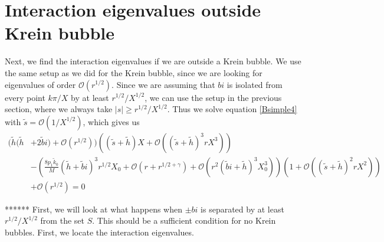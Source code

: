 \documentclass[thesis.tex]{subfiles}
\begin{document}
\section{Interaction eigenvalues outside Krein bubble}

Next, we find the interaction eigenvalues if we are outside a Krein bubble. We use the same setup as we did for the Krein bubble, since we are looking for eigenvalues of order $\mathcal{O}(r^{1/2})$. Since we are assuming that $bi$ is isolated from every point $k \pi / X$ by at least $r^{1/2}/X^{1/2}$, we can use the setup in the previous section, where we always take $|s| \geq r^{1/2}/X^{1/2}$. Thus we solve equation \cref{Bsimple4} with $\tilde{s} = \mathcal{O}(1/X^{1/2})$, which gives us
\begin{equation}\label{Binteig1}
\begin{aligned}
( \tilde{h}( \tilde{h} &+ 2 \tilde{b} i) + \mathcal{O}( r^{1/2} ))\left( (\tilde{s} + \tilde{h})X + \mathcal{O}\left( (\tilde{s} + \tilde{h})^3 r X^3 \right) \right) \\ 
&- \left(\frac{8 p_1 \tilde{k}_0}{M} ( \tilde{h} + \tilde{b}i)^3 r^{1/2} X_0 + \mathcal{O}(r + r^{1/2 + \gamma}) + \mathcal{O}(r^{2} (\tilde{b}i + \tilde{h})^3 X_0^3) \right)\left( 1 + \mathcal{O}\left( (\tilde{s} + \tilde{h})^2 r X^2 \right) \right) \\
&+ \mathcal{O}( r^{1/2} ) = 0
\end{aligned}
\end{equation} 




******
First, we will look at what happens when $\pm bi$ is separated by at least $r^{1/2}/X^{1/2}$ from the set $S$. This should be a sufficient condition for no Krein bubbles. First, we locate the interaction eigenvalues.
\end{document}
